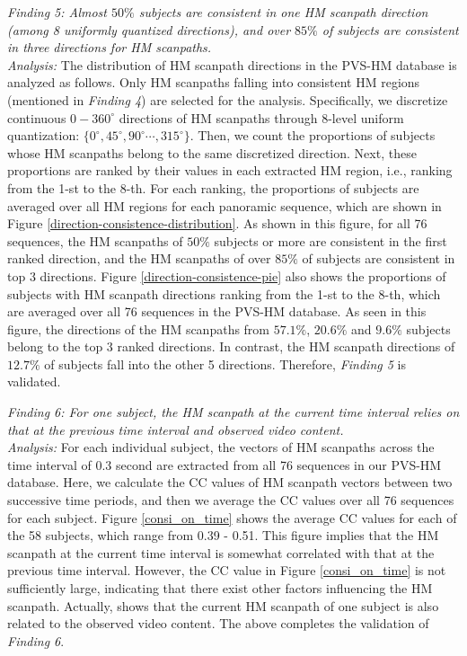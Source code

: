 \documentclass[10pt,journal,compsoc]{IEEEtran}
\begin{document}
\emph{Finding 5: Almost $50\%$ subjects are consistent in one HM scanpath direction (among 8 uniformly quantized directions), and over $85\%$ of subjects are consistent in three directions for HM scanpaths. }
\\ \textit{Analysis:} The distribution of HM scanpath directions in the PVS-HM database is analyzed as follows.
Only HM scanpaths falling into consistent HM regions (mentioned in \textit{Finding 4}) are selected for the analysis.
Specifically, we discretize continuous $0-360^{\circ}$ directions of HM scanpaths through 8-level uniform quantization: $\{0^{\circ}, 45^{\circ}, 90^{\circ} \cdots, 315^{\circ} \}$.
Then, we count the proportions of subjects whose HM scanpaths belong to the same discretized direction. Next, these proportions are ranked by their values in each extracted HM region, i.e., ranking from the 1-st to the 8-th. For each ranking, the proportions of subjects are averaged over all HM regions for each panoramic sequence, which are shown in Figure \ref{direction-consistence-distribution}.
As shown in this figure, for all 76 sequences, the HM scanpaths of $50\%$ subjects or more are consistent in the first ranked direction, and the HM scanpaths of over $85\%$ of subjects are consistent in top 3 directions. Figure \ref{direction-consistence-pie} also shows the proportions of subjects with HM scanpath directions ranking from the 1-st to the 8-th, which are averaged over all 76 sequences in the PVS-HM database.
As seen in this figure, the directions of the HM scanpaths from $57.1\%$, $20.6\%$ and $9.6\%$ subjects belong to the top 3 ranked directions. In contrast, the HM scanpath directions of $12.7\%$ of subjects fall into the other 5 directions. Therefore, \textit{Finding 5} is validated.




\vspace{-.1em}
\emph{Finding 6: For one subject, the HM scanpath at the current time interval relies on that at the previous time interval and observed video content. }
\\ \textit{Analysis:} For each individual subject, the vectors of HM scanpaths across the time interval of 0.3 second are extracted from all 76 sequences in our PVS-HM database. Here, we calculate the CC values of HM scanpath vectors between two successive time periods, and then we average the CC values over all 76 sequences for each subject. Figure \ref{consi_on_time} shows the average CC values for each of the 58 subjects, which range from 0.39 - 0.51. This figure implies that the HM scanpath at the current time interval is somewhat correlated with that at the previous time interval. However, the CC value in Figure \ref{consi_on_time} is not sufficiently large, indicating that there exist other factors influencing the HM scanpath. Actually, \cite{hu2017deep} shows that the current HM scanpath of one subject is also related to the observed video content. The above completes the validation of \textit{Finding 6}.
\end{document}
